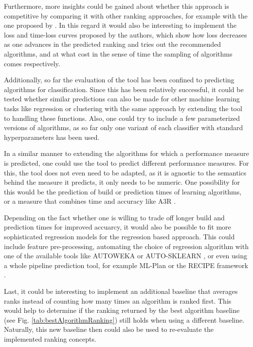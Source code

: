 Furthermore, more insights could be gained about whether this approach is competitive by comparing it with other ranking approaches, for example with the one proposed by \citeauthor{DBLP:journals/ml/AbdulrahmanBRV18} \cite{DBLP:journals/ml/AbdulrahmanBRV18}. In this regard it would also be interesting to implement the loss and time-loss curves proposed by the authors, which show how loss decreases as one advances in the predicted ranking and tries out the recommended algorithms, and at what cost in the sense of time the sampling of algorithms comes respectively.

Additionally, so far the evaluation of the tool has been confined to predicting algorithms for classification. Since this has been relatively successful, it could be tested whether similar predictions can also be made for other machine learning tasks like regression or clustering with the same approach by extending the tool to handling these functions. Also, one could try to include a few parameterized versions of algorithms, as so far only one variant of each classifier with standard hyperparameters has been used. 

In a similar manner to extending the algorithms for which a performance measure is predicted, one could use the tool to predict different performance measures. For this, the tool does not even need to be adapted, as it is agnostic to the semantics behind the measure it predicts, it only needs to be numeric. One possibility for this would be the prediction of build or prediction times of learning algorithms, or a measure that combines time and accuracy like A3R \cite{DBLP:journals/ml/AbdulrahmanBRV18}.

Depending on the fact whether one is willing to trade off longer build and prediction times for improved accuarcy, it would also be possible to fit more sophisticated regression models for the regression based approach. This could include feature pre-processing, automating the choice of regression algorithm with one of the available tools like AUTOWEKA \cite{thornton2013auto} or AUTO-SKLEARN \cite{feurer2015efficient}, or even using a whole pipeline prediction tool, for example ML-Plan \cite{wever2017automatic} or the RECIPE framework \cite{DBLP:conf/eurogp/SaPOP17}. 

Last, it could be interesting to implement an additional baseline that averages ranks instead of counting how many times an algorithm is ranked first. This would help to determine if the ranking returned by the best algorithm baseline (see Fig. \ref{tab:bestAlgorithmRanking}) still holds when using a different baseline. Naturally, this new baseline then could also be used to re-evaluate the implemented ranking concepts. 


